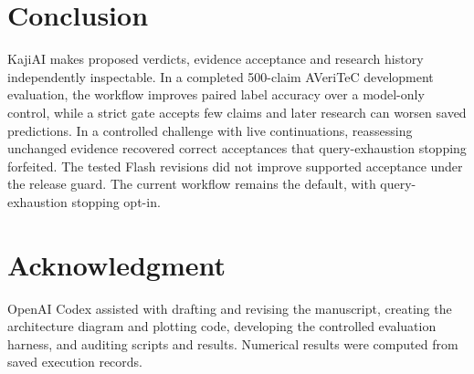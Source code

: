 \documentclass[conference]{IEEEtran}
\begin{document}
\section{Conclusion}
KajiAI makes proposed verdicts, evidence acceptance and research history independently inspectable. In a completed 500-claim AVeriTeC development evaluation, the workflow improves paired label accuracy over a model-only control, while a strict gate accepts few claims and later research can worsen saved predictions. In a controlled challenge with live continuations, reassessing unchanged evidence recovered correct acceptances that query-exhaustion stopping forfeited. The tested Flash revisions did not improve supported acceptance under the release guard. The current workflow remains the default, with query-exhaustion stopping opt-in.

\section*{Acknowledgment}
OpenAI Codex assisted with drafting and revising the manuscript, creating the architecture diagram and plotting code, developing the controlled evaluation harness, and auditing scripts and results. Numerical results were computed from saved execution records.
\end{document}
